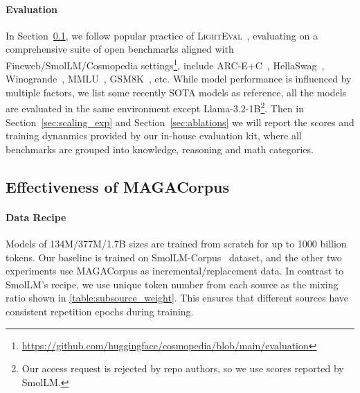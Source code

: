 \paragraph{Evaluation}
In Section~\ref{sec:main_exp}, we follow popular practice of \textsc{LightEval}~\citep{lighteval}, evaluating on a comprehensive suite of open benchmarks aligned with Fineweb/SmolLM/Cosmopedia settings\footnote{\url{https://github.com/huggingface/cosmopedia/blob/main/evaluation}}, 
include ARC-E+C~\citep{clark2018think}, HellaSwag~\citep{zellers2019hellaswag}, Winogrande~\citep{sakaguchi2021winogrande}, MMLU~\citep{hendrycks2020measuring}, GSM8K~\citep{cobbe2021gsm8k}, etc.
While model performance is influenced by multiple factors, we list some recently SOTA models as reference, all the models are evaluated in the same environment except Llama-3.2-1B\footnote{Our access request is rejected by repo authors, so we use scores reported by SmolLM.}.
Then in Section~\ref{sec:scaling_exp} and Section~\ref{sec:ablations} we will report the scores and training dynanmics provided by our in-house evaluation kit, where all benchmarks are grouped into knowledge, reasoning and math categories.
\vspace{-0.5em}
\subsection{Effectiveness of MAGACorpus}
\label{sec:main_exp}
\vspace{-0.5em}
\paragraph{Data Recipe}
Models of 134M/377M/1.7B sizes are trained from scratch for up to 1000 billion tokens.
Our baseline is trained on SmolLM-Corpus~\citep{benallal2024smollmcorpus} dataset,
and the other two experiments use MAGACorpus as incremental/replacement data.
In contrast to SmolLM's recipe, we use unique token number from each source as the mixing ratio shown in \autoref{table:subsource_weight}.
This ensures that different sources have consistent repetition epochs during training.

\begin{table*}[h]
  \vspace{-1.5em}
  \centering
  \caption{MAGACorpus experiments data source weight (\%).
  }
  \begin{adjustbox}{max width=0.85\textwidth}
  \end{adjustbox}

  \label{table:subsource_weight}
  \vspace{-1em}
\end{table*}

